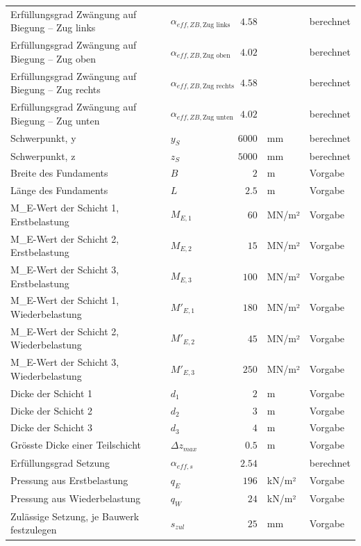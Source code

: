 \documentclass[11pt,a4paper]{article}
\begin{document}
\begin{xltabular}{\linewidth}{>{\raggedright\arraybackslash}Xlrll}
Erfüllungsgrad Zwängung auf Biegung – Zug links & $\alpha_{eff,ZB,\text{Zug links}}$ & $4.58$ &  & berechnet \\
Erfüllungsgrad Zwängung auf Biegung – Zug oben & $\alpha_{eff,ZB,\text{Zug oben}}$ & $4.02$ &  & berechnet \\
Erfüllungsgrad Zwängung auf Biegung – Zug rechts & $\alpha_{eff,ZB,\text{Zug rechts}}$ & $4.58$ &  & berechnet \\
Erfüllungsgrad Zwängung auf Biegung – Zug unten & $\alpha_{eff,ZB,\text{Zug unten}}$ & $4.02$ &  & berechnet \\
Schwerpunkt, y & $y_S$ & $6000$ & mm & berechnet \\
Schwerpunkt, z & $z_S$ & $5000$ & mm & berechnet \\
Breite des Fundaments & $B$ & $2$ & m & Vorgabe \\
Länge des Fundaments & $L$ & $2.5$ & m & Vorgabe \\
M\_E-Wert der Schicht 1, Erstbelastung & $M_{E,1}$ & $60$ & MN/m² & Vorgabe \\
M\_E-Wert der Schicht 2, Erstbelastung & $M_{E,2}$ & $15$ & MN/m² & Vorgabe \\
M\_E-Wert der Schicht 3, Erstbelastung & $M_{E,3}$ & $100$ & MN/m² & Vorgabe \\
M\_E-Wert der Schicht 1, Wiederbelastung & $M'_{E,1}$ & $180$ & MN/m² & Vorgabe \\
M\_E-Wert der Schicht 2, Wiederbelastung & $M'_{E,2}$ & $45$ & MN/m² & Vorgabe \\
M\_E-Wert der Schicht 3, Wiederbelastung & $M'_{E,3}$ & $250$ & MN/m² & Vorgabe \\
Dicke der Schicht 1 & $d_{1}$ & $2$ & m & Vorgabe \\
Dicke der Schicht 2 & $d_{2}$ & $3$ & m & Vorgabe \\
Dicke der Schicht 3 & $d_{3}$ & $4$ & m & Vorgabe \\
Grösste Dicke einer Teilschicht & $\Delta z_{max}$ & $0.5$ & m & Vorgabe \\
Erfüllungsgrad Setzung & $\alpha_{eff,s}$ & $2.54$ &  & berechnet \\
Pressung aus Erstbelastung & $q_E$ & $196$ & kN/m² & Vorgabe \\
Pressung aus Wiederbelastung & $q_W$ & $24$ & kN/m² & Vorgabe \\
Zulässige Setzung, je Bauwerk festzulegen & $s_{zul}$ & $25$ & mm & Vorgabe \\
\hline
\end{xltabular}
\end{document}
